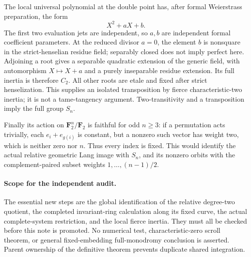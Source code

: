 The local universal polynomial at the double point has, after
formal Weierstrass preparation, the form
\[
                       X^2+aX+b.
\]
The first two evaluation jets are independent, so \(a,b\)
are independent formal coefficient parameters. At the reduced
divisor \(a=0\), the element \(b\) is nonsquare in the
strict-henselian residue field; separably closed does not imply
perfect here. Adjoining a root gives a separable quadratic
extension of the generic field, with automorphism
\(X\mapsto X+a\) and a purely inseparable residue extension.
Its full inertia is therefore \(C_2\). All other roots are
etale and fixed after strict henselization. This supplies an
isolated transposition by fierce characteristic-two inertia;
it is not a tame-tangency argument. Two-transitivity and a
transposition imply the full group \(S_n\).

Finally its action on \(\mathbf F_2^n/\mathbf F_2\) is faithful
for odd \(n\ge3\): if a permutation acts trivially, each
\(e_i+e_{g(i)}\) is constant, but a nonzero such vector has
weight two, which is neither zero nor \(n\). Thus every index
is fixed. This would identify the actual relative geometric
Lang image with \(S_n\), and its nonzero orbits with the
complement-paired subset weights \(1,\ldots,(n-1)/2\).

\paragraph{Scope for the independent audit.}
The essential new steps are the global identification of the
relative degree-two quotient, the completed invariant-ring
calculation along its fixed curve, the actual complete-system
restriction, and the local fierce inertia. They must all be
checked before this note is promoted. No numerical test,
characteristic-zero scroll theorem, or general fixed-embedding
full-monodromy conclusion is asserted. Parent ownership of the
definitive theorem prevents duplicate shared integration.
